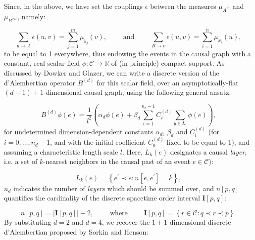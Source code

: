 \documentclass{article}
\begin{document}
Since, in the above, we have set the couplings ${\epsilon}$ between the measures ${\mu_{A^{in}}}$ and ${\mu_{B^{out}}}$, namely:

\begin{equation}
\sum_{u \to A} \epsilon \left( u, v \right) = \sum_{j = 1}^{m} \mu_{y_j} \left( v \right), \qquad \text{ and } \qquad \sum_{B \to v} \epsilon \left( u, v \right) = \sum_{i = 1}^{n} \mu_{x_i} \left( u \right),
\end{equation}
to be equal to 1 everywhere, thus endowing the events in the causal graph with a constant, real scalar field ${\phi : \mathcal{C} \to \mathbb{R}}$ of (in principle) compact support. As discussed by Dowker and Glazer\cite{dowker}, we can write a discrete version of the d'Alembertian operator ${B^{\left( d \right)}}$ for this scalar field, over an asymptotically-flat ${\left( d - 1 \right) + 1}$-dimensional causal graph, using the following general ansatz:

\begin{equation}
B^{\left( d \right)} \phi \left( e \right) = \frac{1}{l^2} \left( \alpha_d \phi \left( e \right) + \beta_{d} \sum_{i = 1}^{n_d - 1} C_{i}^{\left( d \right)} \sum_{y \in L_i} \phi \left( e \right) \right),
\end{equation}
for undetermined dimension-dependent constants ${\alpha_d}$, ${\beta_d}$ and ${C_{i}^{\left( d \right)}}$ (for ${i = 0, \dots, n_d - 1}$, and with the initial coefficient ${C_{0}^{\left( d \right)}}$ fixed to be equal to 1), and assuming a characteristic length scale $l$. Here, ${L_k \left( e \right)}$ designates a causal \textit{layer}, i.e. a set of $k$-nearest neighbors in the causal past of an event ${e \in \mathcal{C}}$):

\begin{equation}
L_k \left( e \right) = \left\lbrace e^{\prime} \prec e : n \left[ e, e^{\prime} \right] = k \right\rbrace,
\end{equation}
${n_d}$ indicates the number of \textit{layers} which should be summed over, and ${n \left[ p, q \right]}$ quantifies the cardinality of the discrete spacetime order interval ${\mathbf{I} \left[ p, q \right]}$:

\begin{equation}
n \left[ p, q \right] = \left\lvert \mathbf{I} \left[ p, q \right] \right\rvert - 2, \qquad \text{ where } \qquad \mathbf{I} \left[ p, q \right] = \left\lbrace r \in \mathcal{C} : q \prec r \prec p \right\rbrace.
\end{equation}
By substituting ${d = 2}$ and ${d = 4}$, we recover the ${1 + 1}$-dimensional discrete d'Alembertian proposed by Sorkin and Henson\cite{sorkin}\cite{henson}:
\end{document}
